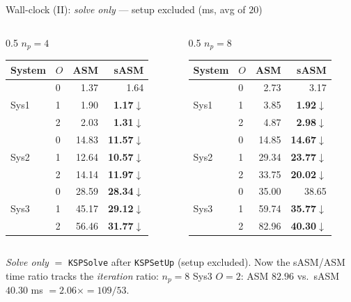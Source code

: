 \documentclass[aspectratio=169,11pt]{beamer}
\newcommand{\dn}{\textcolor{good}{$\downarrow$}}
\begin{document}
\begin{frame}{Wall-clock (II): \emph{solve only} --- setup excluded (ms, avg of $20$)}
\begin{columns}[T]
\begin{column}{0.5\textwidth}
\centering $n_p=4$\\[0.2em]
\begin{table}\scriptsize
\begin{tabular}{@{}llrr@{}}
\toprule
System & $O$ & ASM & sASM \\
\midrule
\multirow{3}{*}{Sys1}&0&1.37&1.64\\&1&1.90&\textbf{1.17}\dn\\&2&2.03&\textbf{1.31}\dn\\
\midrule
\multirow{3}{*}{Sys2}&0&14.83&\textbf{11.57}\dn\\&1&12.64&\textbf{10.57}\dn\\&2&14.14&\textbf{11.97}\dn\\
\midrule
\multirow{3}{*}{Sys3}&0&28.59&\textbf{28.34}\dn\\&1&45.17&\textbf{29.12}\dn\\&2&56.46&\textbf{31.77}\dn\\
\bottomrule
\end{tabular}
\end{table}
\end{column}
\begin{column}{0.5\textwidth}
\centering $n_p=8$\\[0.2em]
\begin{table}\scriptsize
\begin{tabular}{@{}llrr@{}}
\toprule
System & $O$ & ASM & sASM \\
\midrule
\multirow{3}{*}{Sys1}&0&2.73&3.17\\&1&3.85&\textbf{1.92}\dn\\&2&4.87&\textbf{2.98}\dn\\
\midrule
\multirow{3}{*}{Sys2}&0&14.85&\textbf{14.67}\dn\\&1&29.34&\textbf{23.77}\dn\\&2&33.75&\textbf{20.02}\dn\\
\midrule
\multirow{3}{*}{Sys3}&0&35.00&38.65\\&1&59.74&\textbf{35.77}\dn\\&2&82.96&\textbf{40.30}\dn\\
\bottomrule
\end{tabular}
\end{table}
\end{column}
\end{columns}
\vspace{0.2em}
\footnotesize \emph{Solve only} $=$ \texttt{KSPSolve} after \texttt{KSPSetUp} (setup excluded). Now the sASM/ASM time ratio tracks the \emph{iteration} ratio: $n_p{=}8$ Sys3 $O{=}2$: ASM $82.96$ vs.\ sASM $40.30$ ms $=2.06\times=109/53$.
\end{frame}
\end{document}
